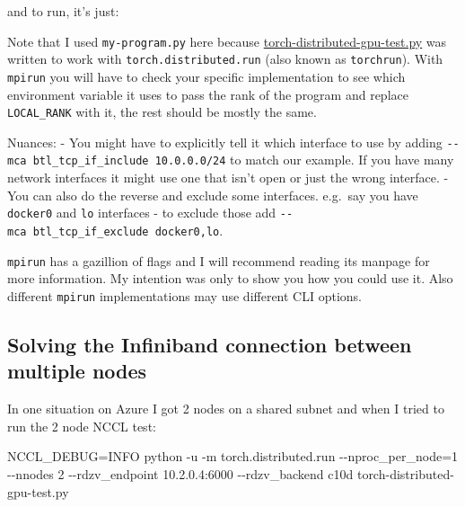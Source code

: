 \documentclass[
]{report}
\newenvironment{Shaded}{\begin{snugshade}}{\end{snugshade}}
\newcommand{\AttributeTok}[1]{\textcolor[rgb]{0.40,0.45,0.13}{#1}}
\newcommand{\ExtensionTok}[1]{\textcolor[rgb]{0.00,0.23,0.31}{#1}}
\newcommand{\NormalTok}[1]{\textcolor[rgb]{0.00,0.23,0.31}{#1}}
\newcommand{\OperatorTok}[1]{\textcolor[rgb]{0.37,0.37,0.37}{#1}}
\newcommand{\VariableTok}[1]{\textcolor[rgb]{0.07,0.07,0.07}{#1}}
\begin{document}
and to run, it's just:

\begin{Shaded}
\end{Shaded}

Note that I used \texttt{my-program.py} here because
\href{./torch-distributed-gpu-test.py}{torch-distributed-gpu-test.py}
was written to work with \texttt{torch.distributed.run} (also known as
\texttt{torchrun}). With \texttt{mpirun} you will have to check your
specific implementation to see which environment variable it uses to
pass the rank of the program and replace \texttt{LOCAL\_RANK} with it,
the rest should be mostly the same.

Nuances: - You might have to explicitly tell it which interface to use
by adding \texttt{-\/-mca\ btl\_tcp\_if\_include\ 10.0.0.0/24} to match
our example. If you have many network interfaces it might use one that
isn't open or just the wrong interface. - You can also do the reverse
and exclude some interfaces. e.g.~say you have \texttt{docker0} and
\texttt{lo} interfaces - to exclude those add
\texttt{-\/-mca\ btl\_tcp\_if\_exclude\ docker0,lo}.

\texttt{mpirun} has a gazillion of flags and I will recommend reading
its manpage for more information. My intention was only to show you how
you could use it. Also different \texttt{mpirun} implementations may use
different CLI options.

\subsection{Solving the Infiniband connection between multiple
nodes}\label{solving-the-infiniband-connection-between-multiple-nodes}

In one situation on Azure I got 2 nodes on a shared subnet and when I
tried to run the 2 node NCCL test:

\begin{Shaded}
\begin{Highlighting}[]
\VariableTok{NCCL\_DEBUG}\OperatorTok{=}\NormalTok{INFO }\ExtensionTok{python} \AttributeTok{{-}u} \AttributeTok{{-}m}\NormalTok{ torch.distributed.run }\AttributeTok{{-}{-}nproc\_per\_node}\OperatorTok{=}\NormalTok{1 }\AttributeTok{{-}{-}nnodes}\NormalTok{ 2 }\AttributeTok{{-}{-}rdzv\_endpoint}\NormalTok{ 10.2.0.4:6000  }\AttributeTok{{-}{-}rdzv\_backend}\NormalTok{ c10d torch{-}distributed{-}gpu{-}test.py}
\end{Highlighting}
\end{Shaded}
\end{document}

